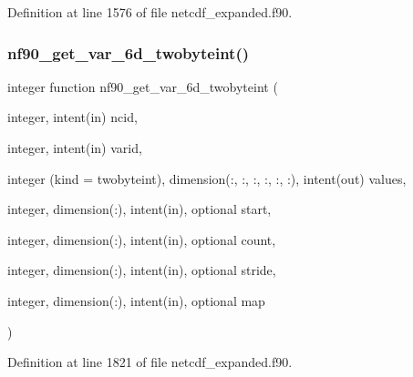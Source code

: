 Definition at line 1576 of file netcdf\+\_\+expanded.\+f90.

\mbox{\label{netcdf__expanded_8f90_a6552783ff6a4fce87261f6af7ed89e72}} 
\subsubsection{\texorpdfstring{nf90\+\_\+get\+\_\+var\+\_\+6d\+\_\+twobyteint()}{nf90\_get\_var\_6d\_twobyteint()}}
{\footnotesize\ttfamily integer function nf90\+\_\+get\+\_\+var\+\_\+6d\+\_\+twobyteint (\begin{DoxyParamCaption}\item[{integer, intent(in)}]{ncid,  }\item[{integer, intent(in)}]{varid,  }\item[{integer (kind = twobyteint), dimension(\+:, \+:, \+:, \+:, \+:, \+:), intent(out)}]{values,  }\item[{integer, dimension(\+:), intent(in), optional}]{start,  }\item[{integer, dimension(\+:), intent(in), optional}]{count,  }\item[{integer, dimension(\+:), intent(in), optional}]{stride,  }\item[{integer, dimension(\+:), intent(in), optional}]{map }\end{DoxyParamCaption})}



Definition at line 1821 of file netcdf\+\_\+expanded.\+f90.

\mbox{\label{netcdf__expanded_8f90_a4c355b564687b432062f2ba6b851a238}} 
